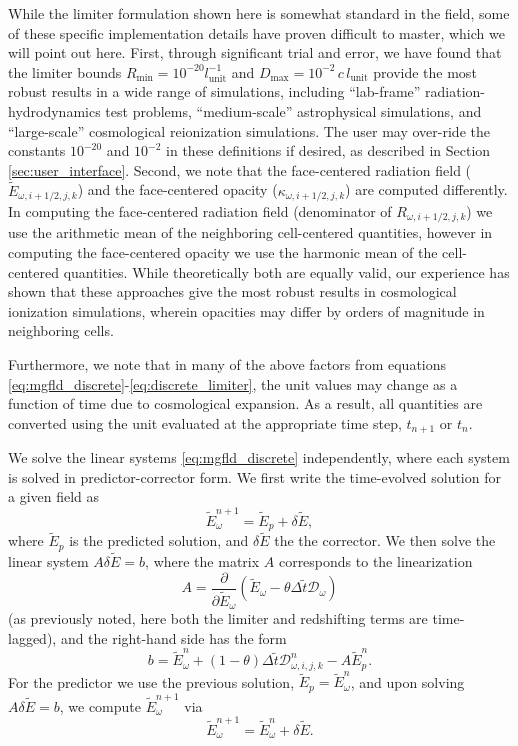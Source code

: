 \documentclass[10pt]{article}
\renewcommand{\(}{\left(}
\renewcommand{\)}{\right)}
\newcommand{\mD}{{\mathcal D}}
\newcommand{\Lunit}{l_{\text{unit}}}
\newcommand{\tT}{\tilde{t}}
\newcommand{\tE}{\tilde{E}}
\begin{document}
While the limiter formulation shown here is somewhat standard in the
field, some of these specific implementation details have proven
difficult to master, which we will point out here.  First, through
significant trial and error, we have found that the limiter
bounds $R_\text{min}=10^{-20} \Lunit^{-1}$ and 
$D_\text{max}=10^{-2}\, c\, \Lunit$ provide the most robust results
in a wide range of simulations, including ``lab-frame''
radiation-hydrodynamics test problems, ``medium-scale'' astrophysical
simulations, and ``large-scale'' cosmological reionization
simulations.  The user may over-ride the constants $10^{-20}$ and
$10^{-2}$ in these definitions if desired, as described in Section
\ref{sec:user_interface}.  Second, we note that the face-centered
radiation field ($\tE_{\omega,i+1/2,j,k}$) and the face-centered
opacity ($\kappa_{\omega,i+1/2,j,k}$) are computed differently.  In
computing the face-centered radiation field (denominator of
$R_{\omega,i+1/2,j,k}$) we use the arithmetic mean of the neighboring 
cell-centered quantities, however in computing the face-centered
opacity we use the harmonic mean of the cell-centered quantities.
While theoretically both are equally valid, our experience has shown
that these approaches give the most robust results in cosmological
ionization simulations, wherein opacities may differ by orders of
magnitude in neighboring cells.

Furthermore, we note that in many of the above factors from equations
\eqref{eq:mgfld_discrete}-\eqref{eq:discrete_limiter}, the unit
values may change as a function of time due to cosmological expansion.
As a result, all quantities are converted using the unit evaluated at
the appropriate time step, $t_{n+1}$ or $t_n$.

We solve the linear systems \eqref{eq:mgfld_discrete} independently,
where each system is solved in predictor-corrector form.  We first
write the time-evolved solution for a given field as 
\[
  \tE_{\omega}^{n+1} = \tE_{p} + \delta\tE,
\]
where $\tE_p$ is the predicted solution, and $\delta\tE$ the the
corrector.  We then solve the linear system $A \delta\tE = b$, where
the matrix $A$ corresponds to the linearization
\[
   A = \frac{\partial}{\partial\tE_{\omega}} \left(\tE_{\omega} - \theta\Delta \tT \mD_{\omega}\right)
\]
(as previously noted, here both the limiter and redshifting terms are
time-lagged), and the right-hand side has the form
\[
  b = \tE_{\omega}^n + (1-\theta)\Delta \tT \mD_{\omega,i,j,k}^{n} - A\tE_{p}^n.
\]
For the predictor we use the previous solution, $\tE_p =
\tE_{\omega}^n$, and upon solving $A \delta\tE = b$, we compute
$\tE_{\omega}^{n+1}$ via
\[
  \tE_{\omega}^{n+1} = \tE_{\omega}^n + \delta\tE.
\]
\end{document}
